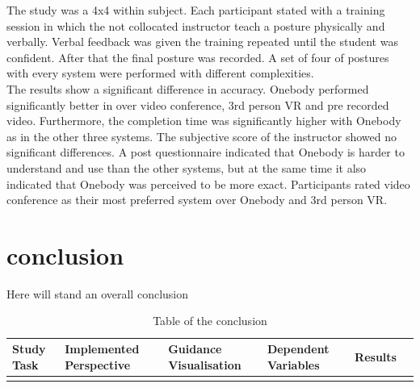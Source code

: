 The study was a 4x4 within subject. Each participant stated with a training session in which the not collocated instructor teach a posture physically and verbally. Verbal feedback was given the training repeated until the student was confident. After that the final posture was recorded. A set of four of postures with every system were performed with different complexities.\\
The results show a significant difference in accuracy. Onebody performed significantly better in over video conference, 3rd person VR and pre recorded video. Furthermore, the completion time was significantly higher with Onebody as in the other three systems. The subjective score of the instructor showed no significant differences. A post questionnaire indicated that Onebody is harder to understand and use than the other systems, but at the same time it also indicated that Onebody was perceived to be more exact. Participants rated video conference as their most preferred system over Onebody and 3rd person VR.

\section{conclusion}
Here will stand an overall conclusion
\begin{table}[H]
	\begin{tabular}{|l|l|l|l|l|l|}
		\hline
		Study Task & Implemented Perspective & Guidance Visualisation & Dependent Variables & Results & \\ \hline
		&  &  &  &  & \\ \hline
	\end{tabular}
	\caption{Table of the conclusion}
\end{table}

